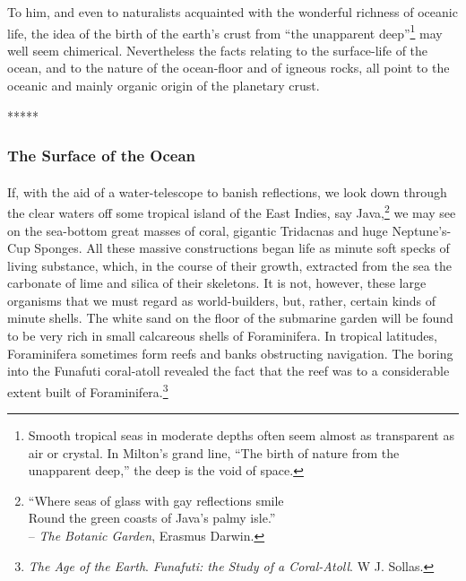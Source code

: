 \documentclass[a4paper, 12pt, oneside, landscape]{article}
\begin{document}
To him, and even to naturalists acquainted with the wonderful richness of oceanic life, the idea of the birth of the earth's crust from ``the unapparent deep''\footnote{Smooth tropical seas in moderate depths often seem almost as transparent as air or crystal. In Milton's grand line, ``The birth of nature from the unapparent deep,'' the deep is the void of space.} may well seem chimerical. Nevertheless the facts relating to the surface-life of the ocean, and to the nature of the ocean-floor and of igneous rocks, all point to the oceanic and mainly organic origin of the planetary crust.

\centerline{*\hspace{15mm}*\hspace{15mm}*\hspace{15mm}*\hspace{15mm}*}
\bigskip

\subsubsection{The Surface of the Ocean}
\paragraph{}
If, with the aid of a water-telescope to banish reflections, we look down through the clear waters off some tropical island of the East Indies, say Java,\footnote{``Where seas of glass with gay reflections smile\\\hspace*{5mm}Round the green coasts of Java's palmy isle.''\\\hspace*{10mm}-- \emph{The Botanic Garden}, Erasmus Darwin.} we may see on the sea-bottom great masses of coral, gigantic Tridacnas and huge Neptune's-Cup Sponges. All these massive constructions began life as minute soft specks of living substance, which, in the course of their growth, extracted from the sea the carbonate of lime and silica of their skeletons. It is not, however, these large organisms that we must regard as world-builders, but, rather, certain kinds of minute shells. The white sand on the floor of the submarine garden will be found to be very rich in small calcareous shells of Foraminifera. In tropical latitudes, Foraminifera sometimes form reefs and banks obstructing navigation. The boring into the Funafuti coral-atoll revealed the fact that the reef was to a considerable extent built of Foraminifera.\footnote{\emph{The Age of the Earth}. \emph{Funafuti: the Study of a Coral-Atoll}. W J. Sollas.}
\end{document}
